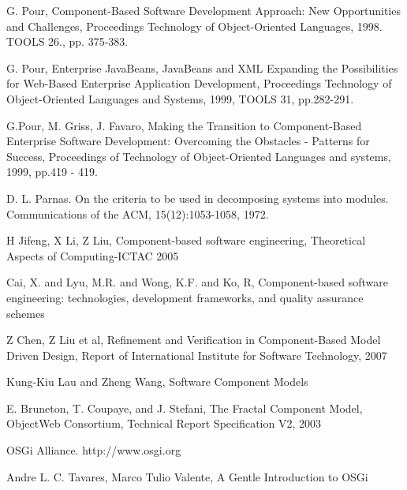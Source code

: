 \begin{thebibliography}{99}

 G. Pour, Component-Based Software Development Approach: New Opportunities and Challenges, Proceedings Technology of Object-Oriented Languages, 1998. TOOLS 26., pp. 375-383.

  G. Pour,  Enterprise JavaBeans,  JavaBeans and XML Expanding the Possibilities for Web-Based Enterprise Application Development,  Proceedings Technology of Object-Oriented Languages and Systems, 1999, TOOLS 31, pp.282-291.

 G.Pour, M. Griss, J. Favaro, Making the Transition to Component-Based Enterprise Software Development: Overcoming the Obstacles - Patterns for Success, Proceedings of Technology of Object-Oriented Languages and systems, 1999, pp.419 - 419.

 D. L. Parnas. On the criteria to be used in decomposing systems into modules. Communications of the ACM, 15(12):1053-1058, 1972.

 H Jifeng, X Li, Z Liu, Component-based software engineering, Theoretical Aspects of Computing-ICTAC 2005

 Cai, X. and Lyu, M.R. and Wong, K.F. and Ko, R, Component-based software engineering: technologies, development frameworks, and quality assurance schemes

 Z Chen, Z Liu et al, Refinement and Verification in Component-Based Model Driven Design, Report of International Institute for Software Technology, 2007

 Kung-Kiu Lau and Zheng Wang, Software Component Models

 E. Bruneton, T. Coupaye, and J. Stefani, The Fractal Component Model, ObjectWeb Consortium, Technical Report Specification V2, 2003

 OSGi Alliance. http://www.osgi.org 

 Andre L. C. Tavares, Marco Tulio Valente, A Gentle Introduction to OSGi


\end{thebibliography}